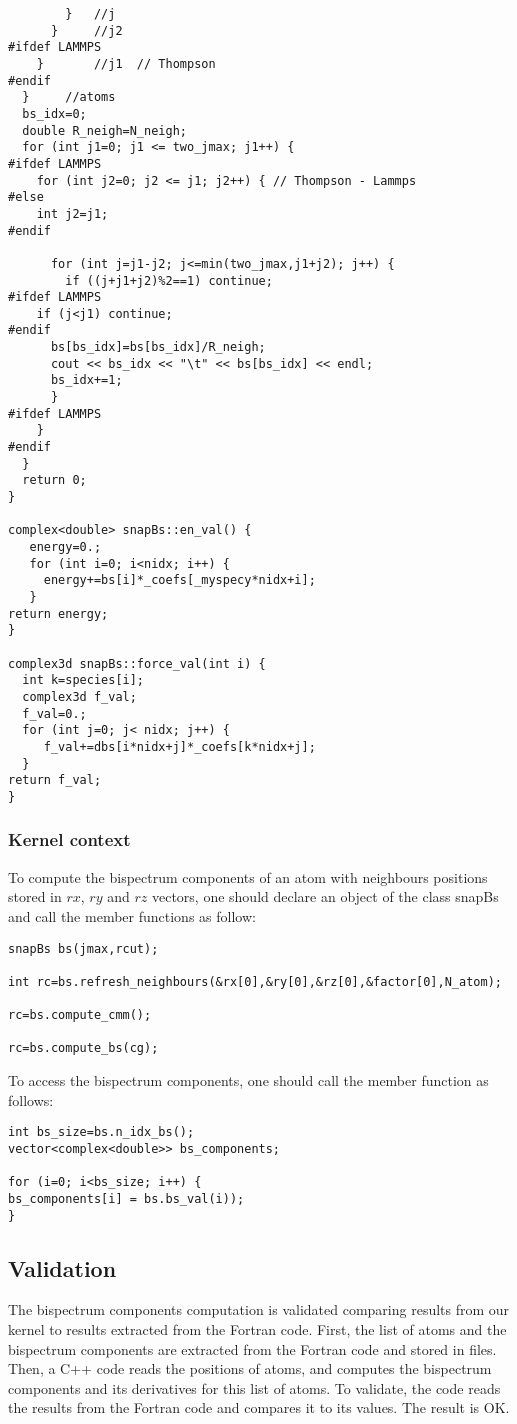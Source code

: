 \documentclass[12pt]{article}
\begin{document}
\begin{lstlisting}
        }	//j
      }		//j2
#ifdef LAMMPS
    }		//j1  // Thompson
#endif
  }		//atoms
  bs_idx=0;
  double R_neigh=N_neigh;
  for (int j1=0; j1 <= two_jmax; j1++) {
#ifdef LAMMPS
    for (int j2=0; j2 <= j1; j2++) { // Thompson - Lammps
#else
    int j2=j1;
#endif

      for (int j=j1-j2; j<=min(two_jmax,j1+j2); j++) {
        if ((j+j1+j2)%2==1) continue;
#ifdef LAMMPS
	if (j<j1) continue;
#endif
      bs[bs_idx]=bs[bs_idx]/R_neigh;
      cout << bs_idx << "\t" << bs[bs_idx] << endl;
      bs_idx+=1;
      }
#ifdef LAMMPS
    }
#endif
  }
  return 0;
}

complex<double> snapBs::en_val() {
   energy=0.;
   for (int i=0; i<nidx; i++) {
     energy+=bs[i]*_coefs[_myspecy*nidx+i];
   }
return energy;
}

complex3d snapBs::force_val(int i) {
  int k=species[i];
  complex3d f_val;
  f_val=0.;
  for (int j=0; j< nidx; j++) {
     f_val+=dbs[i*nidx+j]*_coefs[k*nidx+j];
  }
return f_val;
}
        \end{lstlisting}

      \subsubsection{Kernel context}

To compute the bispectrum components of an atom with neighbours positions stored in $rx$, $ry$ and $rz$ vectors, one should declare an object of the class snapBs and call the member functions as follow:
        \begin{lstlisting}
snapBs bs(jmax,rcut);

int rc=bs.refresh_neighbours(&rx[0],&ry[0],&rz[0],&factor[0],N_atom);

rc=bs.compute_cmm();

rc=bs.compute_bs(cg);
        \end{lstlisting}
To access the bispectrum components, one should call the member function as follows:
	\begin{lstlisting}
int bs_size=bs.n_idx_bs();
vector<complex<double>> bs_components;

for (i=0; i<bs_size; i++) {
bs_components[i] = bs.bs_val(i));
}
	\end{lstlisting}

\subsection{Validation}
The bispectrum components computation is validated comparing results from our kernel to results extracted from the Fortran code. First, the list of atoms and the bispectrum components are extracted from the Fortran code and stored in files. Then, a C++ code reads the positions of atoms, and computes the bispectrum components and its derivatives for this list of atoms. To validate, the code reads the results from the Fortran code and compares it to its values. The result is OK.
\end{document}
